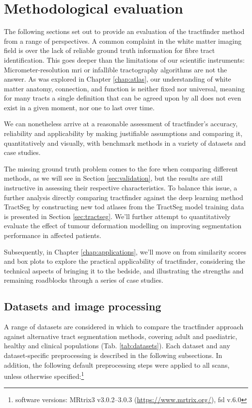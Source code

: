 \chapter{Methodological evaluation}\label{chap:eval}

The following sections set out to provide an evaluation of the tractfinder method from a range of perspectives.
A common complaint in the white matter imaging field is over the lack of reliable ground truth information for fibre tract identification.
This goes deeper than the limitations of our scientific instruments:
Micrometer-resolution \gls{mri} or infallible tractography algorithms are not the answer.
As was explored in Chapter \ref{chap:atlas}, our understanding of white matter anatomy, connection, and function is neither fixed nor universal, meaning for many tracts a single definition that can be agreed upon by all does not even exist in a given moment, nor one to last over time.

We can nonetheless arrive at a reasonable assessment of tractfinder's accuracy, reliability and applicability by making justifiable assumptions and comparing it, quantitatively and visually, with benchmark methods in a variety of datasets and case studies.

The missing ground truth problem comes to the fore when comparing different methods, as we will see in Section \ref{sec:validation}, but the results are still instructive in assessing their respective characteristics.
To balance this issue, a further analysis directly comparing tractfinder against the deep learning method TractSeg by constructing new \gls{tod} atlases from the TractSeg model training data is presented in Section \ref{sec:tractseg}.
We'll further attempt to quantitatively evaluate the effect of tumour deformation modelling on improving segmentation performance in affected patients.

Subsequently, in Chapter \ref{chap:applications}, we'll move on from similarity scores and box plots to explore the practical applicability of tractfinder, considering the technical aspects of bringing it to the bedside, and illustrating the strengths and remaining roadblocks through a series of case studies.

\section{Datasets and image processing}
\label{sec:data}

A range of datasets are considered in which to compare the tractfinder approach against alternative tract segmentation methods, covering adult and paediatric, healthy and clinical populations (Tab. \ref{tab:datasets}).
Each dataset and any dataset-specific preprocessing is described in the following subsections.
In addition, the following default preprocessing steps were applied to all scans, unless otherwise specified:\footnote[2]{software versions: MRtrix3 v3.0.2--3.0.3 (\url{https://www.mrtrix.org/}), \gls{fsl} v.6.0}

